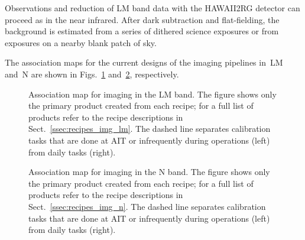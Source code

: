 Observations and reduction of LM band data with the HAWAII2RG detector
can proceed as in the near infrared. After dark subtraction and
flat-fielding, the background is estimated from a series of dithered
science exposures or from exposures on a nearby blank patch of sky.

The association maps for the current designs of the imaging pipelines
in~LM and~N are shown in Figs.~\ref{fig:IMG_LM_Assomap}
and~\ref{fig:IMG_N_Assomap}, respectively.


\begin{landscape}
  \begin{figure}
    \centering
    \resizebox{\linewidth}{!}{}
    \caption[Reduction cascade and association map for imaging in L and
      M]{Association map for imaging in the LM band. The figure shows only
      the primary product created from each recipe; for a full list of
      products refer to the recipe descriptions in
      Sect.~\ref{ssec:recipes_img_lm}. The dashed line separates
      calibration tasks that are done at AIT or infrequently during
      operations (left) from daily tasks (right).}
    \label{fig:IMG_LM_Assomap}
  \end{figure}
\end{landscape}

\begin{landscape}
\begin{figure}
  \centering
    \resizebox{\linewidth}{!}{}
    \caption[Reduction cascade and association map for imaging in N]{%
      Association map for imaging in the N band. The figure shows
      only the primary product created from each recipe; for a full
      list of products refer to the recipe descriptions in
      Sect.~\ref{ssec:recipes_img_n}. The dashed line separates
      calibration tasks that are done at AIT or infrequently during
      operations (left) from daily tasks (right).}
    \label{fig:IMG_N_Assomap}
  \end{figure}
\end{landscape}
\restoregeometry

